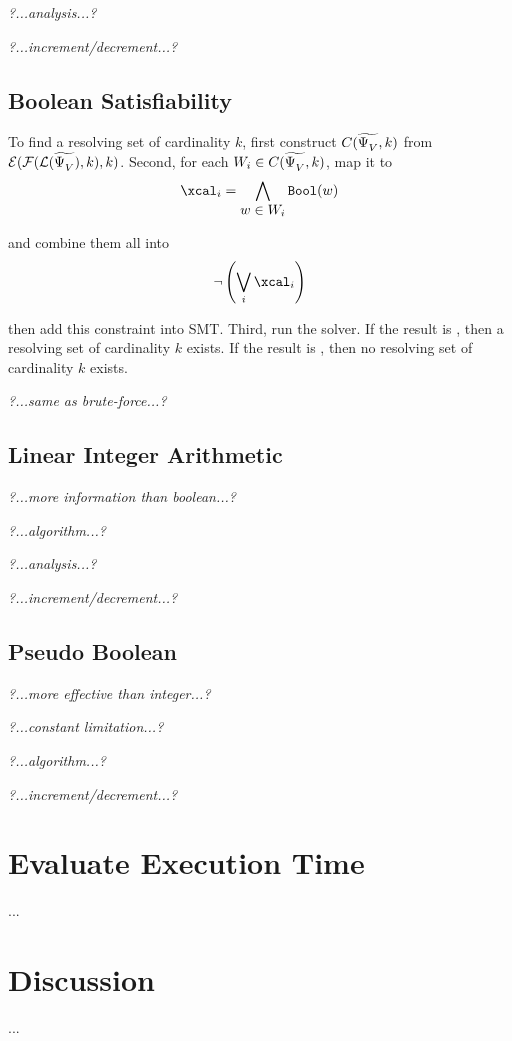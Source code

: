 \textit{?...analysis...?}

\textit{?...increment/decrement...?}

\subsection{Boolean Satisfiability}

To find a resolving set of cardinality \(k\), first construct \(C(\widetilde{\Psi^{}_{V}},k)\) from \(\mathcal{E}(\mathcal{F}(\mathcal{L}(\widetilde{\Psi^{}_{V}}),k),k)\). Second, for each \(W_i \in C(\widetilde{\Psi^{}_{V}},k)\), map it to
	\[ \xcal_i = \bigwedge \limits_{\displaystyle w \in W_i} \bool(w) \]

and combine them all into
	\[ \neg \left( \bigvee \limits_{i} \mathcal \xcal_i \right) \]

then add this constraint into SMT. Third, run the solver. If the result is \sat, then a resolving set of cardinality \(k\) exists. If the result is \unsat, then no resolving set of cardinality \(k\) exists.

\textit{?...same as brute-force...?}

\cleardoublepage
\subsection{Linear Integer Arithmetic}

\textit{?...more information than boolean...?}

\textit{?...algorithm...?}

\textit{?...analysis...?}

\textit{?...increment/decrement...?}

\subsection{Pseudo Boolean}

\textit{?...more effective than integer...?}

\textit{?...constant limitation...?}

\textit{?...algorithm...?}

\textit{?...increment/decrement...?}

\section{Evaluate Execution Time}
...

\section{Discussion}
...
